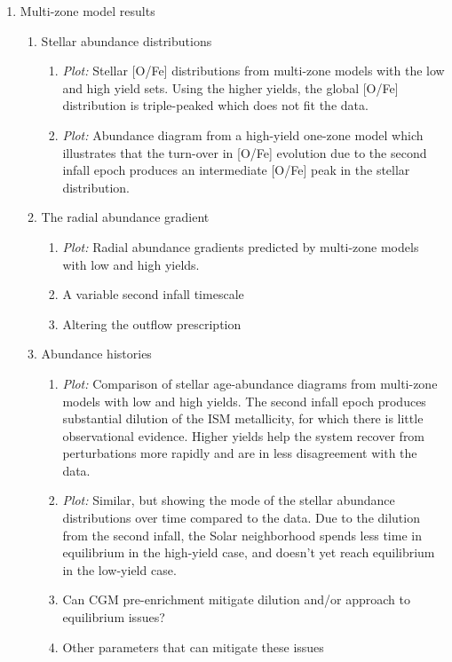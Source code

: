 \begin{enumerate}
    \item Multi-zone model results
    \begin{enumerate}
        \item Stellar abundance distributions
        \begin{enumerate}
            \item {\it Plot:} Stellar [O/Fe] distributions from multi-zone models with the low and high yield sets. Using the higher yields, the global [O/Fe] distribution is triple-peaked which does not fit the data.
            \item {\it Plot:} Abundance diagram from a high-yield one-zone model which illustrates that the turn-over in [O/Fe] evolution due to the second infall epoch produces an intermediate [O/Fe] peak in the stellar distribution.
        \end{enumerate}
        \item The radial abundance gradient
        \begin{enumerate}
            \item {\it Plot:} Radial abundance gradients predicted by multi-zone models with low and high yields.
            \item A variable second infall timescale
            \item Altering the outflow prescription
        \end{enumerate}
        \item Abundance histories
        \begin{enumerate}
            \item {\it Plot:} Comparison of stellar age-abundance diagrams from multi-zone models with low and high yields. The second infall epoch produces substantial dilution of the ISM metallicity, for which there is little observational evidence. Higher yields help the system recover from perturbations more rapidly and are in less disagreement with the data.
            \item {\it Plot:} Similar, but showing the mode of the stellar abundance distributions over time compared to the data. Due to the dilution from the second infall, the Solar neighborhood spends less time in equilibrium in the high-yield case, and doesn't yet reach equilibrium in the low-yield case.
            \item Can CGM pre-enrichment mitigate dilution and/or approach to equilibrium issues?
            \item Other parameters that can mitigate these issues
        \end{enumerate}
    \end{enumerate}
    

\end{enumerate}
